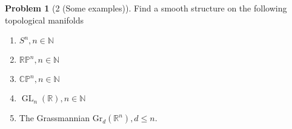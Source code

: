 \documentclass[reqno]{amsart}
\theoremstyle{definition}
\newtheorem{problem}[theorem]{Problem}
\theoremstyle{remark}
\DeclareMathOperator{\GL}{GL}
\begin{document}
    \begin{problem}[2 (Some examples)]
        Find a smooth structure on the following topological
        manifolds
        \begin{enumerate}
            \item $S^{n}, n \in \mathbb{N} $ 
            \item $\mathbb{R}\mathbb{P}^{n}, n \in \mathbb{N} $ 
            \item $\mathbb{C}\mathbb{P}^{n}, n \in \mathbb{N} $ 
            \item $\GL_n \left( \mathbb{R} \right) ,n
                \in \mathbb{N} $ 
            \item The Grassmannian
                $\text{Gr}_d \left( \mathbb{R}^{n} \right) ,
                d \le n$.
        \end{enumerate}
    \end{problem}
\end{document}
